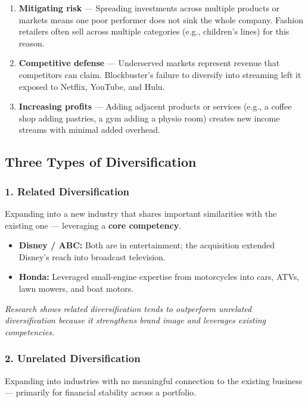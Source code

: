 \documentclass[11pt, letterpaper]{article}
\begin{document}
\begin{enumerate}[leftmargin=*, label=\textbf{\arabic*.}]
  \item \textbf{Mitigating risk} --- Spreading investments across multiple products or markets means one poor performer does not sink the whole company. Fashion retailers often sell across multiple categories (e.g., children's lines) for this reason.
  \item \textbf{Competitive defense} --- Underserved markets represent revenue that competitors can claim. Blockbuster's failure to diversify into streaming left it exposed to Netflix, YouTube, and Hulu.
  \item \textbf{Increasing profits} --- Adding adjacent products or services (e.g., a coffee shop adding pastries, a gym adding a physio room) creates new income streams with minimal added overhead.
\end{enumerate}

\subsection{Three Types of Diversification}

\subsubsection{1. Related Diversification}
Expanding into a new industry that shares important similarities with the existing one --- leveraging a \textbf{core competency}.

\begin{itemize}[leftmargin=*]
  \item \textbf{Disney / ABC:} Both are in entertainment; the acquisition extended Disney's reach into broadcast television.
  \item \textbf{Honda:} Leveraged small-engine expertise from motorcycles into cars, ATVs, lawn mowers, and boat motors.
\end{itemize}

\textit{Research shows related diversification tends to outperform unrelated diversification because it strengthens brand image and leverages existing competencies.}

\subsubsection{2. Unrelated Diversification}
Expanding into industries with no meaningful connection to the existing business --- primarily for financial stability across a portfolio.
\end{document}

